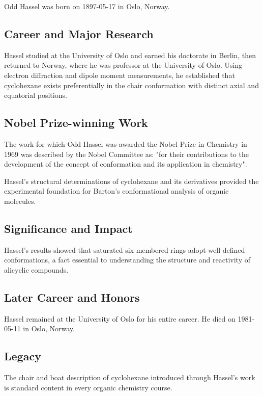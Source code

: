 Odd Hassel was born on 1897-05-17 in Oslo, Norway.

\subsection*{Career and Major Research}

Hassel studied at the University of Oslo and earned his doctorate in Berlin, then returned to Norway, where he was professor at the University of Oslo. Using electron diffraction and dipole moment measurements, he established that cyclohexane exists preferentially in the chair conformation with distinct axial and equatorial positions.

\subsection*{Nobel Prize-winning Work}

The work for which Odd Hassel was awarded the Nobel Prize in Chemistry in 1969 was described by the Nobel Committee as: "for their contributions to the development of the concept of conformation and its application in chemistry".

Hassel's structural determinations of cyclohexane and its derivatives provided the experimental foundation for Barton's conformational analysis of organic molecules.

\subsection*{Significance and Impact}

Hassel's results showed that saturated six-membered rings adopt well-defined conformations, a fact essential to understanding the structure and reactivity of alicyclic compounds.

\subsection*{Later Career and Honors}

Hassel remained at the University of Oslo for his entire career. He died on 1981-05-11 in Oslo, Norway.

\subsection*{Legacy}

The chair and boat description of cyclohexane introduced through Hassel's work is standard content in every organic chemistry course.

